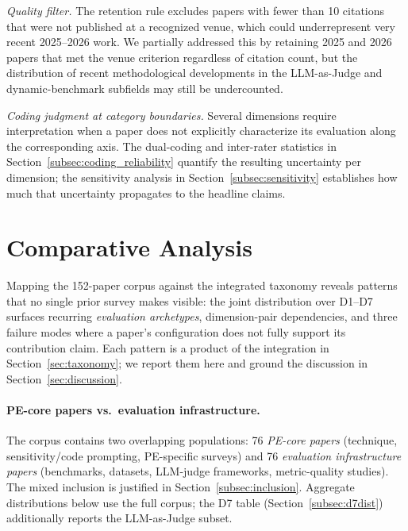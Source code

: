 \documentclass[acmsmall, nonacm, screen]{acmart}
\begin{document}
\textit{Quality filter.} The retention rule excludes papers with
fewer than 10 citations that were not published at a recognized
venue, which could underrepresent very recent 2025--2026 work. We
partially addressed this by retaining 2025 and 2026 papers that met
the venue criterion regardless of citation count, but the
distribution of recent methodological developments in the LLM-as-Judge
and dynamic-benchmark subfields may still be undercounted.

\textit{Coding judgment at category boundaries.} Several dimensions
require interpretation when a paper does not explicitly characterize
its evaluation along the corresponding axis. The dual-coding and
inter-rater statistics in Section~\ref{subsec:coding_reliability}
quantify the resulting uncertainty per dimension; the sensitivity
analysis in Section~\ref{subsec:sensitivity} establishes how much
that uncertainty propagates to the headline claims.

\section{Comparative Analysis}
\label{sec:comparison}

Mapping the 152-paper corpus against the integrated taxonomy reveals
patterns that no single prior survey makes visible: the joint
distribution over D1--D7 surfaces recurring \textit{evaluation
archetypes}, dimension-pair dependencies, and three failure modes
where a paper's configuration does not fully support its
contribution claim. Each pattern is a product of the integration in
Section~\ref{sec:taxonomy}; we report them here and ground the
discussion in Section~\ref{sec:discussion}.

\paragraph{PE-core papers vs.\ evaluation infrastructure.} The corpus
contains two overlapping populations: 76 \emph{PE-core papers}
(technique, sensitivity/code prompting, PE-specific surveys) and 76
\emph{evaluation infrastructure papers} (benchmarks, datasets,
LLM-judge frameworks, metric-quality studies). The mixed inclusion is
justified in Section~\ref{subsec:inclusion}. Aggregate distributions
below use the full corpus; the D7 table
(Section~\ref{subsec:d7dist}) additionally reports the LLM-as-Judge
subset.
\end{document}
